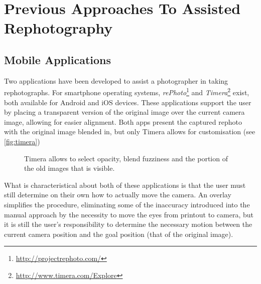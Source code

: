 \section{Previous Approaches To Assisted Rephotography}

\subsection{Mobile Applications}\label{subsec:mobile_apps}

Two applications have been developed to assist a photographer in taking
rephotographs. For smartphone operating systems,
\emph{rePhoto}\footnote{\url{http://projectrephoto.com/}} and
\emph{Timera}\footnote{\url{http://www.timera.com/Explore}} exist, both
available for Android and iOS devices. These applications support the user by placing a transparent
version of the original image over the current camera image, allowing for easier
alignment. 
Both apps present the captured rephoto with the original image blended in, but
only Timera allows for customisation (see \autoref{fig:timera})

\begin{figure}
   {\centering      
      \caption[Overlay customisation with Timera]{Timera allows to select opacity,
      blend fuzziness and the portion of the old images that is visible.}
   \label{fig:timera}}
\end{figure}

What is characteristical about both of these applications is that the user must still
determine on their own how to actually move the camera. An overlay simplifies
the procedure, eliminating some of the inaccuracy introduced into the manual approach by the
necessity to move the eyes from printout to camera, but it is still the user's
responsibility to determine the necessary motion between the current camera
position and the goal position (that of the original image). 

